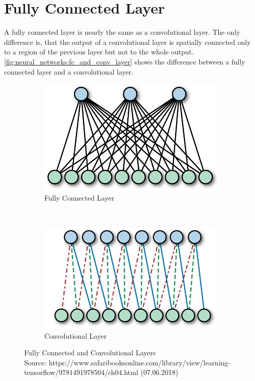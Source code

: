 \section{Fully Connected Layer}
A fully connected layer is nearly the same as a convolutional layer. The only difference is, that the output of a convolutional layer
is spatially connected only to a region of the previous layer but not to the whole output.
\autoref{fig:neural_networks:fc_and_conv_layer} shows the difference between a fully connected layer and a convolutional layer.


\begin{figure}[H]
    \centering
	\begin{subfigure}{0.4\textwidth}
    	\includegraphics[width=0.9\linewidth]{chapters/neural_networks/images/fc_layer.png}		    \caption{Fully Connected Layer}
    	\label{fig:challenges:max_pooling}
	\end{subfigure}~
	\begin{subfigure}{0.4\textwidth}
    	\includegraphics[width=0.9\linewidth]{chapters/neural_networks/images/conv_layer.png}       	\caption{Convolutional Layer}
    	\label{fig:challenges:avg_pooling}
	\end{subfigure}
	\caption{Fully Connected and Convolutional Layers\\Source: https://www.safaribooksonline.com/library/view/learning-tensorflow/9781491978504/ch04.html (07.06.2018)}
	\label{fig:neural_networks:fc_and_conv_layer}
\end{figure}


